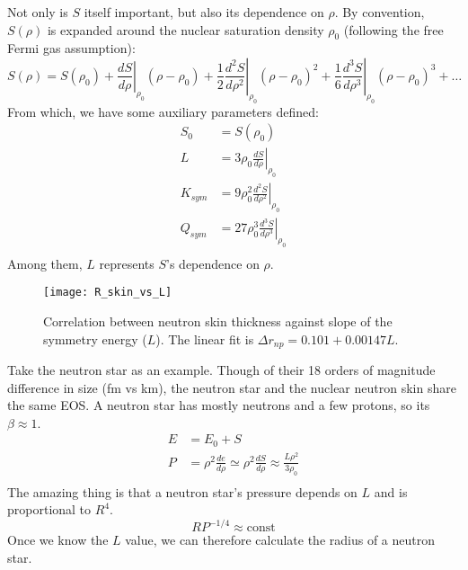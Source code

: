 Not only is $S$ itself important, but also its dependence on $\rho$. 
By convention, $S(\rho)$ is expanded around the nuclear saturation density $\rho_0$
(following the free Fermi gas assumption):
\begin{equation}
    S(\rho) = S(\rho_0) 
    + \left.\frac{dS}{d\rho}\right|_{\rho_0}(\rho - \rho_0)
    + \frac{1}{2}\left.\frac{d^2S}{d\rho^2}\right|_{\rho_0}(\rho - \rho_0)^2
    + \frac{1}{6}\left.\frac{d^3S}{d\rho^3}\right|_{\rho_0}(\rho - \rho_0)^3
    + \dots
\end{equation}
From which, we have some auxiliary parameters defined:
\begin{equation}
    \begin{aligned}
	S_0 &= S(\rho_0)	\\
	L   &= 3\rho_0\left.\frac{dS}{d\rho}\right|_{\rho_0}	\\
	K_{sym}	&= 9\rho_0^2\left.\frac{d^2S}{d\rho^2}\right|_{\rho_0}	\\
	Q_{sym}	&= 27\rho_0^3\left.\frac{d^3S}{d\rho^3}\right|_{\rho_0}	\\
    \end{aligned}
\end{equation}
Among them, $L$ represents $S$'s dependence on $\rho$.
\begin{figure}[H]
    \centering
    \texttt{[image: R\_skin\_vs\_L]}
    \caption{Correlation between \Pb neutron skin thickness against slope of the
    symmetry energy ($L$). The linear fit is $\Delta r_{np} = 0.101 + 0.00147 L$.
    \cite{PhysRevLett.106.252501}}
\end{figure}

Take the neutron star \cite{Lattimer.2001} as an example. Though of their 18 orders of
magnitude difference in size (fm vs km), the neutron star and the nuclear
neutron skin share the same EOS. A neutron star has mostly neutrons and  
a few protons, so its $\beta \approx 1$.
\begin{equation}
    \begin{aligned}
	E &= E_0 + S	\\
	 P &= \rho^2\frac{de}{d\rho} \simeq \rho^2 \frac{dS}{d\rho} \approx \frac{L\rho^2}{3\rho_0}  \\
    \end{aligned}
    \label{eq:EOS_neutron-star}
\end{equation}
The amazing thing is that a neutron star's pressure depends on $L$ and is proportional 
to $R^4$. %
\begin{equation}
    RP^{-1/4} \approx \text{const}    
\end{equation}
Once we know the $L$ value, we can therefore calculate the radius of a neutron star. 

